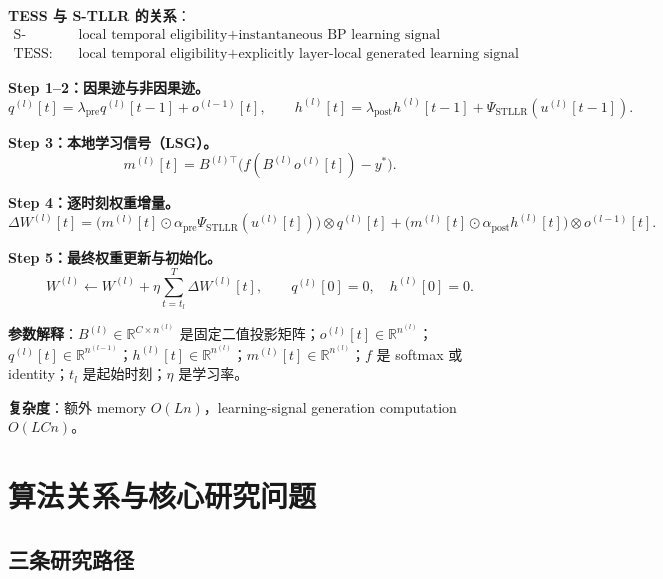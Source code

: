 \documentclass[journal,12pt,onecolumn]{IEEEtran}
\begin{document}
\textbf{TESS 与 S-TLLR 的关系}：
\begin{equation}
\begin{array}{cl}
\text{S-TLLR:} & \text{local temporal eligibility} + \text{instantaneous BP learning signal}\\
\text{TESS:} & \text{local temporal eligibility} + \text{explicitly layer-local generated learning signal}
\end{array}
\end{equation}

\textbf{Step 1--2：因果迹与非因果迹。}
\begin{equation}
q^{(l)}[t]=\lambda_{\mathrm{pre}}q^{(l)}[t-1]+o^{(l-1)}[t],
\qquad
h^{(l)}[t]=\lambda_{\mathrm{post}}h^{(l)}[t-1]+\Psi_{\mathrm{STLLR}}(u^{(l)}[t-1]).
\end{equation}

\textbf{Step 3：本地学习信号（LSG）。}
\begin{equation}
m^{(l)}[t]=B^{(l)\top}\big(f(B^{(l)}o^{(l)}[t])-y^*\big).
\end{equation}

\textbf{Step 4：逐时刻权重增量。}
\begin{equation}
\Delta W^{(l)}[t]
=
\big(m^{(l)}[t]\odot\alpha_{\mathrm{pre}}\Psi_{\mathrm{STLLR}}(u^{(l)}[t])\big)\otimes q^{(l)}[t]
+
\big(m^{(l)}[t]\odot\alpha_{\mathrm{post}}h^{(l)}[t]\big)\otimes o^{(l-1)}[t].
\end{equation}

\textbf{Step 5：最终权重更新与初始化。}
\begin{equation}
W^{(l)}\leftarrow W^{(l)}+\eta\sum_{t=t_l}^{T}\Delta W^{(l)}[t],
\qquad
q^{(l)}[0]=0,\quad h^{(l)}[0]=0.
\end{equation}

\textbf{参数解释}：$B^{(l)}\in\mathbb R^{C\times n^{(l)}}$ 是固定二值投影矩阵；$o^{(l)}[t]\in\mathbb R^{n^{(l)}}$；$q^{(l)}[t]\in\mathbb R^{n^{(l-1)}}$；$h^{(l)}[t]\in\mathbb R^{n^{(l)}}$；$m^{(l)}[t]\in\mathbb R^{n^{(l)}}$；$f$ 是 softmax 或 identity；$t_l$ 是起始时刻；$\eta$ 是学习率。

\textbf{复杂度}：额外 memory $O(Ln)$，learning-signal generation computation $O(LCn)$。

\section{算法关系与核心研究问题}

\subsection{三条研究路径}
\end{document}
